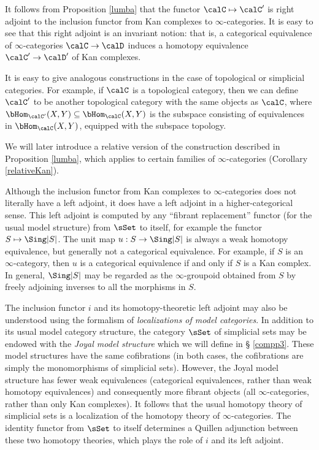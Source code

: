 It follows from Proposition \ref{lumba} that the functor
$\calC \mapsto \calC'$ is right adjoint to
the inclusion functor from Kan complexes to $\infty$-categories. It is easy to see that this right adjoint is an invariant notion: that is, a categorical equivalence of $\infty$-categories $\calC \rightarrow \calD$ induces a homotopy equivalence
$\calC' \rightarrow \calD'$ of Kan complexes. 

\begin{remark}
It is easy to give analogous constructions in the case of topological or simplicial categories. For example, if $\calC$ is a topological category, then we can define $\calC'$ to be another topological category with the same objects as $\calC$, where $\bHom_{\calC'}(X,Y) \subseteq \bHom_{\calC}(X,Y)$ is the subspace consisting of equivalences in $\bHom_{\calC}(X,Y)$, equipped with the subspace topology.
\end{remark}

\begin{remark}
We will later introduce a relative version of the construction described in Proposition \ref{lumba}, which applies to certain families of $\infty$-categories (Corollary \ref{relativeKan}).
\end{remark}

Although the inclusion functor from Kan complexes to $\infty$-categories does not
literally have a left adjoint, it does have a left adjoint in a higher-categorical sense. This left adjoint is computed by any ``fibrant replacement'' functor (for the usual model structure) from $\sSet$ to itself, for
example the functor $S \mapsto \Sing |S|$.
The unit map $u: S \rightarrow
\Sing |S|$ is always a weak homotopy equivalence, but generally not a categorical equivalence. For example, if $S$ is an $\infty$-category, then $u$ is a categorical equivalence if and only if $S$ is a Kan complex. In general, $\Sing |S|$ may be regarded as the $\infty$-groupoid
obtained from $S$ by freely adjoining inverses to all the
morphisms in $S$.

\begin{remark}
The inclusion functor $i$ and its homotopy-theoretic left adjoint
may also be understood using the formalism of {\it
localizations of model categories}. In addition to its usual model
category structure, the category $\sSet$ of simplicial sets may be
endowed with the {\it Joyal model structure} which we will define in \S
\ref{compp3}. These model structures have the same cofibrations (in both cases, the
cofibrations are simply the monomorphisms of simplicial sets).
However, the Joyal model structure has fewer weak equivalences
(categorical equivalences, rather than weak homotopy equivalences)
and consequently more fibrant objects (all $\infty$-categories,
rather than only Kan complexes). It follows that the usual
homotopy theory of simplicial sets is a
localization of the homotopy theory of $\infty$-categories. The
identity functor from $\sSet$ to itself determines a Quillen
adjunction between these two homotopy theories, which plays the
role of $i$ and its left adjoint.
\end{remark}

